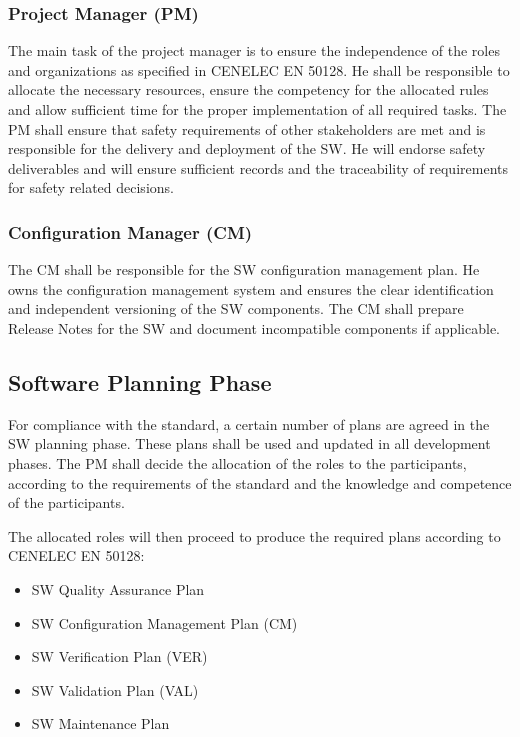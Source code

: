 \subsubsection{Project Manager (PM)}
\label{sec:project-manager}

The main task of the project manager is to ensure the independence of the roles
and organizations as specified in CENELEC EN 50128. He shall be responsible to
allocate the necessary resources, ensure the competency for the allocated rules
and allow sufficient time for the proper implementation of all required
tasks. The PM shall ensure that safety requirements of other stakeholders are
met and is responsible for the delivery and deployment of the SW. He will
endorse safety deliverables and will ensure sufficient records and the
traceability of requirements for safety related decisions.

\subsubsection{Configuration Manager (CM)}
\label{sec:conf-manag}

The CM shall be responsible for the SW configuration management plan. He owns
the configuration management system and ensures the clear identification and
independent versioning of the SW components. The CM shall prepare Release Notes
for the SW and document incompatible components if applicable.

\subsection{Software Planning Phase}
\label{sec:documents--plan}

For compliance with the standard, a certain number of plans are agreed in the SW
planning phase. These plans shall be used and updated in all development
phases. The PM shall decide the allocation of the roles to the participants,
according to the requirements of the standard and the knowledge and competence
of the participants.

The allocated roles will then proceed to produce the required plans according to
CENELEC EN 50128:

\begin{itemize}
\item SW Quality Assurance Plan
\item SW Configuration Management Plan (CM)
\item SW Verification Plan (VER)
\item SW Validation Plan (VAL)
\item SW Maintenance Plan
\end{itemize}


